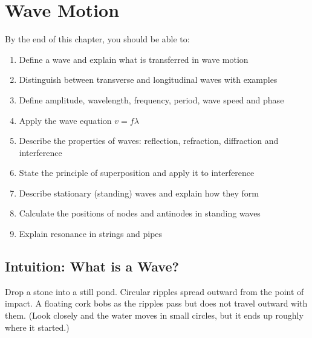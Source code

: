%

\chapter{Wave Motion}
\label{ch:wave_motion}
\minitoc
\newpage


\begin{objectivebox}
By the end of this chapter, you should be able to:
\begin{enumerate}[noitemsep]
  \item Define a wave and explain what is transferred
  in wave motion
  \item Distinguish between transverse and
  longitudinal waves with examples
  \item Define amplitude, wavelength, frequency,
  period, wave speed and phase
  \item Apply the wave equation $v = f\lambda$
  \item Describe the properties of waves: reflection,
  refraction, diffraction and interference
  \item State the principle of superposition and
  apply it to interference
  \item Describe stationary (standing) waves and
  explain how they form
  \item Calculate the positions of nodes and
  antinodes in standing waves
  \item Explain resonance in strings and pipes
\end{enumerate}
\end{objectivebox}

\section{Intuition: What is a Wave?}

Drop a stone into a still pond. Circular ripples
spread outward from the point of impact. A floating cork bobs as the ripples pass but does not travel outward
with them. (Look closely and the water moves in small circles, but it
ends up roughly where it started.)


